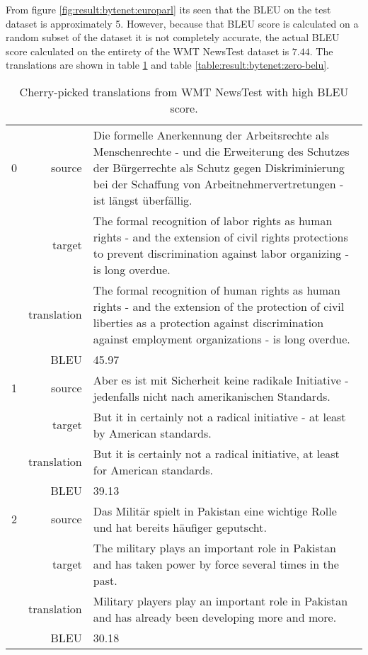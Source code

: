 From figure \ref{fig:result:bytenet:europarl} its seen that the BLEU on the test dataset is approximately 5. However, because that BLEU score is calculated on a random subset of the dataset it is not completely accurate, the actual BLEU score calculated on the entirety of the WMT NewsTest dataset is $7.44$. The translations are shown in table \ref{table:result:bytenet:high-belu} and table \ref{table:result:bytenet:zero-belu}.


\begin{table}[h]
\centering
\begin{tabular}{l|r|p{10cm}}
0 & source & Die formelle Anerkennung der Arbeitsrechte als Menschenrechte - und die Erweiterung des Schutzes der Bürgerrechte als Schutz gegen Diskriminierung bei der Schaffung von Arbeitnehmervertretungen - ist längst überfällig. \\[0.1cm]
& target & The formal recognition of labor rights as human rights - and the extension of civil rights protections to prevent discrimination against labor organizing - is long overdue. \\[0.1cm]
& translation & The formal recognition of human rights as human rights - and the extension of the protection of civil liberties as a protection against discrimination against employment organizations - is long overdue. \\[0.1cm]
& BLEU & 45.97 \\[0.1cm] \hline

1 & source & Aber es ist mit Sicherheit keine radikale Initiative - jedenfalls nicht nach amerikanischen Standards. \\[0.1cm]
& target & But it in certainly not a radical initiative - at least by American standards. \\[0.1cm]
& translation & But it is certainly not a radical initiative, at least for American standards. \\[0.1cm]
& BLEU & 39.13 \\[0.1cm] \hline

2 & source & Das Militär spielt in Pakistan eine wichtige Rolle und hat bereits häufiger geputscht. \\[0.1cm]
& target & The military plays an important role in Pakistan and has taken power by force several times in the past. \\[0.1cm]
& translation & Military players play an important role in Pakistan and has already been developing more and more. \\[0.1cm]
& BLEU & 30.18
\end{tabular}
\caption{Cherry-picked translations from WMT NewsTest with high BLEU score.}
\label{table:result:bytenet:high-belu}
\end{table}

